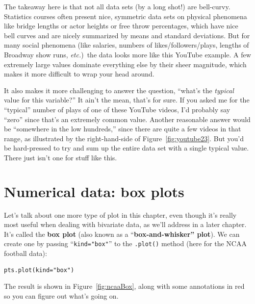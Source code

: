 
The takeaway here is that not all data sets (by a long shot!) are bell-curvy.
Statistics courses often present nice, symmetric data sets on physical
phenomena like bridge lengths or actor heights or free throw percentages, which
have nice bell curves and are nicely summarized by means and standard
deviations. But for many social phenomena (like salaries, numbers of
likes/followers/plays, lengths of Broadway show runs, \textit{etc.})~the data
looks more like this YouTube example. A few extremely large values dominate
everything else by their sheer magnitude, which makes it more difficult to wrap
your head around.

It also makes it more challenging to answer the question, ``what's the
\textit{typical} value for this variable?'' It ain't the mean, that's for sure.
If you asked me for the ``typical'' number of plays of one of these YouTube
videos, I'd probably say ``zero'' since that's an extremely common value.
Another reasonable answer would be ``somewhere in the low hundreds,'' since
there are quite a few videos in that range, as illustrated by the
right-hand-side of Figure~\ref{fig:youtube23}. But you'd be hard-pressed to try
and sum up the entire data set with a single typical value. There just isn't
one for stuff like this.

\section{Numerical data: box plots}


Let's talk about one more type of plot in this chapter, even though it's really
most useful when dealing with bivariate data, as we'll address in a later
chapter. It's called the \textbf{box plot} (also known as a
``\textbf{box-and-whisker'' plot}). We can create one by passing
``\texttt{kind="box"}'' to the \texttt{.plot()} method (here for the NCAA
football data):

\begin{Verbatim}[fontsize=\small,samepage=true,frame=single,framesep=3mm]
pts.plot(kind="box")
\end{Verbatim}

The result is shown in Figure~\ref{fig:ncaaBox}, along with some annotations in
red so you can figure out what's going on.

